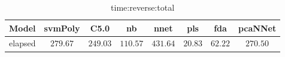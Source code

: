 \begin{table}[!ht]
	\centering
	\begin{tabular}{|c|c|c|c|c|c|c|c|}
		\hline
		Model & svmPoly & C5.0 & nb & nnet & pls & fda & pcaNNet \\ \hline
		elapsed & $279.67$ & $249.03$ & $110.57$ & $431.64$ & $20.83$ & $62.22$ & $270.50$ \\ \hline
	\end{tabular}
	\caption{time:reverse:total}
	\label{tab:time:reverse:total}
\end{table}
